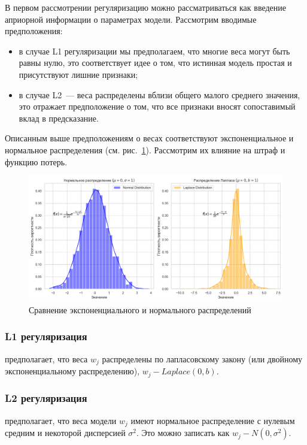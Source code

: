 В первом рассмотрении регуляризацию можно рассматриваться как введение априорной информации о параметрах модели. Рассмотрим вводимые предположения:
\begin{itemize}
	\item в случае L1 регуляризации мы предполагаем, что многие веса могут быть равны нулю, это соответствует идее о том, что истинная модель простая и присутствуют лишние признаки;
	\item в случае L2~--- веса распределены вблизи общего малого среднего значения, это отражает предположение о том, что все признаки вносят сопоставимый вклад в предсказание.
\end{itemize}
\noindent
Описанным выше предположениям о весах соответствуют экспоненциальное и нормальное распределения (см. рис.~\ref{linear-reg-distribution}). Рассмотрим их влияние на штраф и функцию потерь.

\begin{figure}[h]
	\centering
	\includegraphics[width=0.9\linewidth]{chapters/linear/pics/reg-distributions.png}
	\caption{Сравнение экспоненциального и нормального распределений}
	\label{linear-reg-distribution}
\end{figure}

\subsubsection {L1 регуляризация}

предполагает, что веса $w_j$ распределены по лапласовскому закону (или двойному экспоненциальному распределению), $w_j - Laplace(0, b)$.

\subsubsection{L2 регуляризация} 

предполагает, что веса модели $w_j$ имеют нормальное распределение с нулевым средним и некоторой дисперсией $\sigma^2$. Это можно записать как $w_j - N(0, \sigma^2)$.

